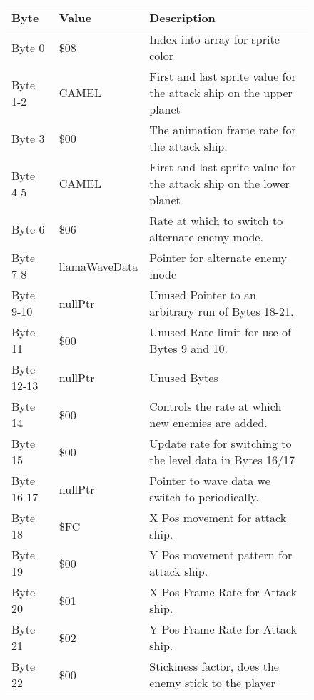 \begin{figure}[H]
{\begin{adjustbox}{width=12cm}
\begin{tabular}{lll}
\toprule
 Byte       & Value              & Description                                                         \\
\midrule
 Byte 0     & \$08                & Index into array for sprite color                                   \\
 Byte 1-2   & CAMEL              & First and last sprite value for the attack ship on the upper planet \\
 Byte 3     & \$00                & The animation frame rate for the attack ship.                       \\
 Byte 4-5   & CAMEL              & First and last sprite value for the attack ship on the lower planet \\
 Byte 6     & \$06                & Rate at which to switch to alternate enemy mode.                    \\
 Byte 7-8   & llamaWaveData      & Pointer for alternate enemy mode                                    \\
 Byte 9-10  & nullPtr            & Unused Pointer to an arbitrary run of Bytes 18-21.                  \\
 Byte 11    & \$00                & Unused Rate limit for use of Bytes 9 and 10.                        \\
 Byte 12-13 & nullPtr            & Unused Bytes                                                        \\
 Byte 14    & \$00                & Controls the rate at which new enemies are added.                   \\
 Byte 15    & \$00                & Update rate for switching to the level data in Bytes 16/17          \\
 Byte 16-17 & nullPtr            & Pointer to wave data we switch to periodically.                     \\
 Byte 18    & \$FC                & X Pos movement for attack ship.                                     \\
 Byte 19    & \$00                & Y Pos movement pattern for attack ship.                             \\
 Byte 20    & \$01                & X Pos Frame Rate for Attack ship.                                   \\
 Byte 21    & \$02                & Y Pos Frame Rate for Attack ship.                                   \\
 Byte 22    & \$00                & Stickiness factor, does the enemy stick to the player               \\

\end{tabular}
\end{adjustbox}}
\end{figure}
